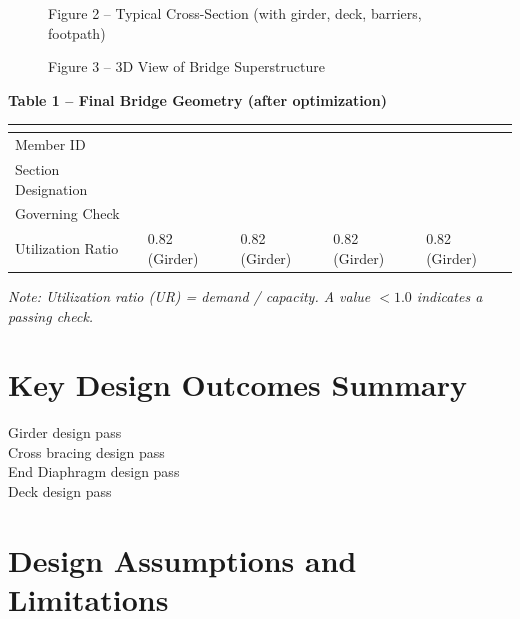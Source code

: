 \documentclass[12pt,a4paper]{report}
\numberwithin{table}{chapter}
\numberwithin{figure}{chapter}
\begin{document}
\newpage

\begin{figure}[H]
\centering
{}
\caption*{Figure 2 -- Typical Cross-Section (with girder, deck, barriers, footpath)}
\end{figure}

\begin{figure}[H]
\centering
{}
\caption*{Figure 3 -- 3D View of Bridge Superstructure}
\end{figure}

\noindent\textbf{Table 1 -- Final Bridge Geometry (after optimization)}

\vspace{0.4em}
\noindent
\begin{tabular}{|C{2.8cm}|C{3.0cm}|C{3.0cm}|C{3.0cm}|C{3.0cm}|}
\hline
  \textbf{} &
  \textbf{} &
  \textbf{} &
  \textbf{} &
  \textbf{} \\
\hline
Member ID &  &  &  &  \\
\hline
Section Designation &  &  &  &  \\
\hline
Governing Check &  &  &  &  \\
\hline
Utilization Ratio & 0.82 (Girder) & 0.82 (Girder) & 0.82 (Girder) & 0.82 (Girder) \\
\hline
\end{tabular}

\vspace{0.4em}
\noindent\textit{Note: Utilization ratio (UR) = demand / capacity. A value $< 1.0$ indicates a passing check.}

\vspace{1em}

\section*{Key Design Outcomes Summary}
\label{sec:key-outcomes}

\noindent Girder design pass \\
Cross bracing design pass \\
End Diaphragm design pass \\
Deck design pass

\section*{Design Assumptions and Limitations}
\label{sec:assumptions}
\end{document}
